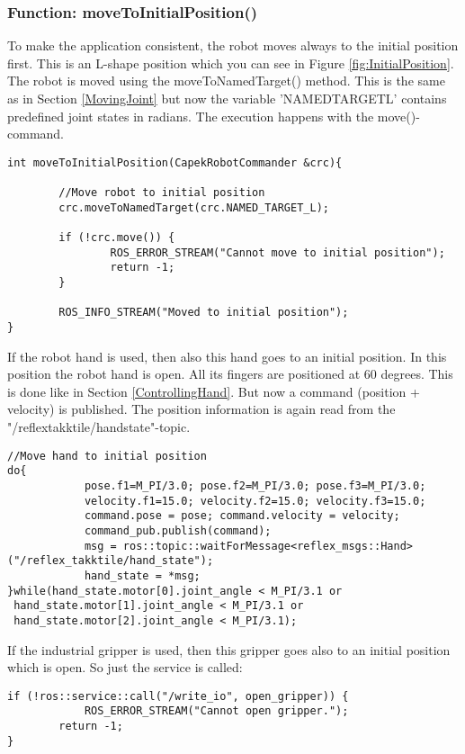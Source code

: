 \documentclass[11pt,a4paper]{report}
\begin{document}
\subsubsection{Function: moveToInitialPosition()}
To make the application consistent, the robot moves always to the initial position first. This is an L-shape position which you can see in Figure \ref{fig:InitialPosition}. The robot is moved using the moveToNamedTarget() method. This is the same as in Section \ref{MovingJoint} but now the variable 'NAMED\textunderscore TARGET\textunderscore L' contains predefined joint states in radians. The execution happens with the move()-command.
\begin{verbatim}
int moveToInitialPosition(CapekRobotCommander &crc){

	    //Move robot to initial position
	    crc.moveToNamedTarget(crc.NAMED_TARGET_L);

	    if (!crc.move()) {
		        ROS_ERROR_STREAM("Cannot move to initial position");
		        return -1;
	    }
	
	    ROS_INFO_STREAM("Moved to initial position");
}
\end{verbatim}
If the robot hand is used, then also this hand goes to an initial position. In this position the robot hand is open. All its fingers are positioned at 60 degrees. This is done like in Section \ref{ControllingHand}. But now a command (position + velocity) is published. The position information is again read from the "/reflex\textunderscore takktile/hand\textunderscore state"-topic.
\begin{verbatim}
//Move hand to initial position
do{
		    pose.f1=M_PI/3.0; pose.f2=M_PI/3.0; pose.f3=M_PI/3.0;
		    velocity.f1=15.0; velocity.f2=15.0; velocity.f3=15.0;
		    command.pose = pose; command.velocity = velocity;
		    command_pub.publish(command);
		    msg = ros::topic::waitForMessage<reflex_msgs::Hand>("/reflex_takktile/hand_state");
		    hand_state = *msg;
}while(hand_state.motor[0].joint_angle < M_PI/3.1 or
 hand_state.motor[1].joint_angle < M_PI/3.1 or
 hand_state.motor[2].joint_angle < M_PI/3.1);
\end{verbatim}
If the industrial gripper is used, then this gripper goes also to an initial position which is open. So just the service is called:
\begin{verbatim}
if (!ros::service::call("/write_io", open_gripper)) {
       		ROS_ERROR_STREAM("Cannot open gripper.");
        return -1;
}
\end{verbatim}
\newpage
\end{document}
